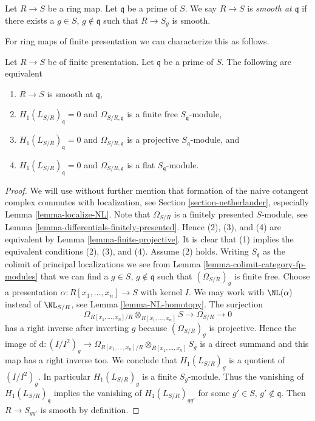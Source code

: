 \begin{definition}
\label{definition-smooth-at-prime}
Let $R \to S$ be a ring map.
Let $\mathfrak q$ be a prime of $S$.
We say $R \to S$ is {\it smooth at $\mathfrak q$} if there
exists a $g \in S$, $g \not \in \mathfrak q$ such
that $R \to S_g$ is smooth.
\end{definition}

\noindent
For ring maps of finite presentation we can characterize this as follows.

\begin{lemma}
\label{lemma-smooth-at-point}
Let $R \to S$ be of finite presentation. Let $\mathfrak q$ be a
prime of $S$. The following are equivalent
\begin{enumerate}
\item $R \to S$ is smooth at $\mathfrak q$,
\item $H_1(L_{S/R})_\mathfrak q = 0$ and
$\Omega_{S/R, \mathfrak q}$ is a finite free $S_\mathfrak q$-module,
\item $H_1(L_{S/R})_\mathfrak q = 0$ and
$\Omega_{S/R, \mathfrak q}$ is a projective $S_\mathfrak q$-module, and
\item $H_1(L_{S/R})_\mathfrak q = 0$ and
$\Omega_{S/R, \mathfrak q}$ is a flat $S_\mathfrak q$-module.
\end{enumerate}
\end{lemma}

\begin{proof}
We will use without further mention that formation of the
naive cotangent complex commutes with localization, see
Section \ref{section-netherlander}, especially
Lemma \ref{lemma-localize-NL}.
Note that $\Omega_{S/R}$ is a finitely presented $S$-module, see
Lemma \ref{lemma-differentials-finitely-presented}. Hence
(2), (3), and (4) are equivalent by Lemma \ref{lemma-finite-projective}.
It is clear that (1) implies the equivalent conditions (2), (3), and (4).
Assume (2) holds. Writing $S_\mathfrak q$ as
the colimit of principal localizations we see from
Lemma \ref{lemma-colimit-category-fp-modules}
that we can find a $g \in S$, $g \not \in \mathfrak q$ such that
$(\Omega_{S/R})_g$ is finite free. Choose a presentation
$\alpha : R[x_1, \ldots, x_n] \to S$ with kernel $I$. We may work
with $\NL(\alpha)$ instead of $\NL_{S/R}$, see
Lemma \ref{lemma-NL-homotopy}. The surjection
$$
\Omega_{R[x_1, \ldots, x_n]/R} \otimes_{R[x_1, \ldots, x_n]} S
\to \Omega_{S/R} \to 0
$$
has a right inverse after inverting $g$ because $(\Omega_{S/R})_g$ is
projective. Hence the image of
$\text{d} : (I/I^2)_g \to
\Omega_{R[x_1, \ldots, x_n]/R} \otimes_{R[x_1, \ldots, x_n]} S_g$
is a direct summand and this map has a right inverse too.
We conclude that $H_1(L_{S/R})_g$ is a quotient of $(I/I^2)_g$.
In particular $H_1(L_{S/R})_g$ is a finite $S_g$-module.
Thus the vanishing of $H_1(L_{S/R})_{\mathfrak q}$
implies the vanishing of $H_1(L_{S/R})_{gg'}$ for some $g' \in S$,
$g' \not \in \mathfrak q$. Then $R \to S_{gg'}$ is smooth by
definition.
\end{proof}


